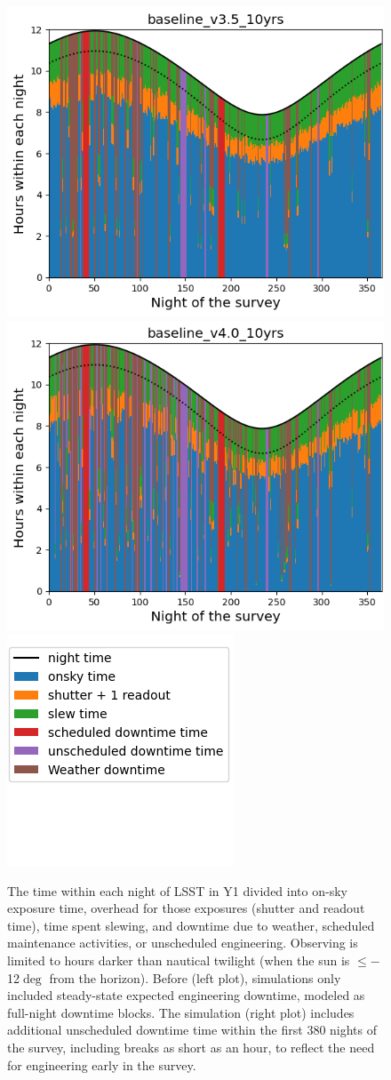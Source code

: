 \begin{itemize}
\begin{figure}[!h]
    \centering
    \includegraphics[width=0.37\linewidth]{figures/downtime_v3_5_year1.png}
    \includegraphics[width=0.37\linewidth]{figures/downtime_v4_0_year1.png}
    \includegraphics[width=0.24\linewidth]{figures/downtime_v4_0_year1_legend.png}
    \caption{The time within each night of LSST  in Y1 divided into on-sky exposure time, overhead for those exposures (shutter and readout time), time spent slewing, and downtime due to weather, scheduled maintenance activities, or unscheduled engineering. Observing is limited to hours darker than nautical twilight (when the sun is  \mbox{$\leq-$12$\deg$} from the horizon). Before  (left plot), simulations only included steady-state expected engineering downtime, modeled as full-night downtime blocks. The  simulation (right plot) includes additional unscheduled downtime time within the first 380 nights of the survey, including breaks as short as an hour, to reflect the need for engineering early in the survey. }
    \label{fig:downtime}
\end{figure}



\end{itemize}
